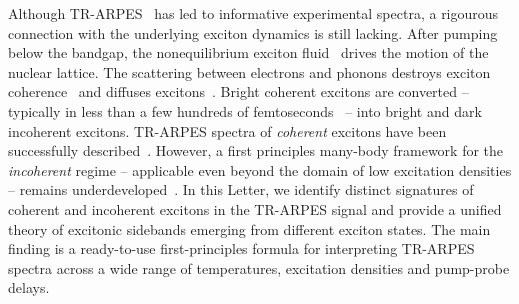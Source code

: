 \documentclass[twocolumn,aps,a4paper,superscriptaddress]{revtex4-2}
\begin{document}
Although TR-ARPES~\cite{na_advancing_2023} has led to
informative experimental spectra,  a rigourous
connection with the underlying exciton dynamics  is still
lacking.
After pumping below the bandgap,
the nonequilibrium exciton
fluid~\cite{haug2009quantum,lindberg_effective_1988,ostreich_non-stationary_1993,hannewald_excitonic_2000,koch_semiconductor_2006}
drives the motion of the nuclear
lattice.
The scattering between electrons and phonons
destroys exciton
coherence~\cite{madrid_phonon-induced_2009,nie_ultrafast_2014,dey_optical_2016,sangalli_an-ab-initio_2018,stefanucci_from-carriers_2021,perfetto_real-time_2023}
and diffuses
excitons~\cite{bertoni_generation_2016,uddin_neutral_2020,perfetto_ultrafast_2021,stefanucci_excitonic_2025}.
Bright coherent excitons are converted
-- typically in less than a few hundreds of femtoseconds~\cite{moody_intrinsic_2015,selig_exciton_2016,jakubczyk_impact_2018} -- into
bright and dark incoherent excitons.
TR-ARPES spectra of {\em coherent} excitons have been successfully
described~\cite{perfetto_pump-driven_2019,perfetto_time-resolved_2020,perfetto_floquet_2020,chan_giant_2023,pareek_driving_2026}.
However,  a first principles many-body framework for
the {\em incoherent} regime -- applicable even beyond the
domain of low excitation densities -- remains underdeveloped~\cite{perfetto_first-principles_2016,steinhoff_exciton_2017,rustagi_photoemission_2018,christiansen_theory_2019}.
In this Letter, we identify distinct signatures of coherent and
incoherent excitons in the TR-ARPES signal and provide a unified
theory of excitonic sidebands emerging from different exciton states.
The main finding is a
ready-to-use first-principles formula for interpreting TR-ARPES spectra
across a wide range
of temperatures, excitation densities and pump-probe delays.
\end{document}
